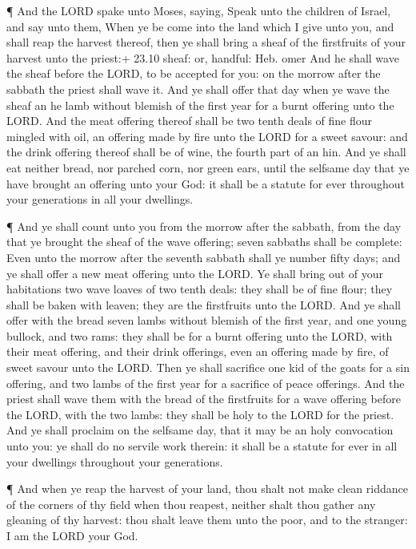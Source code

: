  ¶ And the LORD spake unto Moses, saying, 
Speak unto the children of Israel, and say unto them, When ye be come
into the land which I give unto you, and shall reap the harvest thereof,
then ye shall bring a sheaf of the firstfruits of your harvest unto the
priest:+ 23.10 sheaf: or, handful: Heb. omer  And he shall
wave the sheaf before the LORD, to be accepted for you: on the morrow
after the sabbath the priest shall wave it.  And ye shall
offer that day when ye wave the sheaf an he lamb without blemish of the
first year for a burnt offering unto the LORD.  And the
meat offering thereof shall be two tenth deals of fine flour mingled
with oil, an offering made by fire unto the LORD for a sweet savour: and
the drink offering thereof shall be of wine, the fourth part of an hin.
 And ye shall eat neither bread, nor parched corn, nor
green ears, until the selfsame day that ye have brought an offering unto
your God: it shall be a statute for ever throughout your generations in
all your dwellings.

 ¶ And ye shall count unto you from the morrow after the
sabbath, from the day that ye brought the sheaf of the wave offering;
seven sabbaths shall be complete:  Even unto the morrow
after the seventh sabbath shall ye number fifty days; and ye shall offer
a new meat offering unto the LORD.  Ye shall bring out of
your habitations two wave loaves of two tenth deals: they shall be of
fine flour; they shall be baken with leaven; they are the firstfruits
unto the LORD.  And ye shall offer with the bread seven
lambs without blemish of the first year, and one young bullock, and two
rams: they shall be for a burnt offering unto the LORD, with their meat
offering, and their drink offerings, even an offering made by fire, of
sweet savour unto the LORD.  Then ye shall sacrifice one
kid of the goats for a sin offering, and two lambs of the first year for
a sacrifice of peace offerings.  And the priest shall wave
them with the bread of the firstfruits for a wave offering before the
LORD, with the two lambs: they shall be holy to the LORD for the priest.
 And ye shall proclaim on the selfsame day, that it may be
an holy convocation unto you: ye shall do no servile work therein: it
shall be a statute for ever in all your dwellings throughout your
generations.

 ¶ And when ye reap the harvest of your land, thou shalt
not make clean riddance of the corners of thy field when thou reapest,
neither shalt thou gather any gleaning of thy harvest: thou shalt leave
them unto the poor, and to the stranger: I am the LORD your God.

